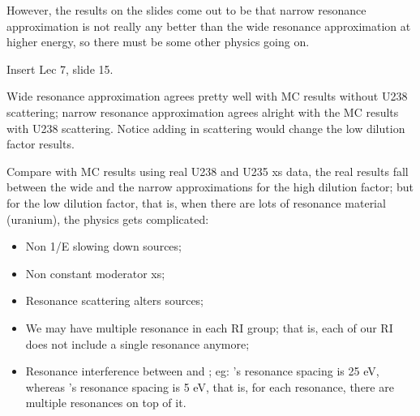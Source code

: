 \documentclass{school-22.211-notes}
\begin{document}
However, the results on the slides come out to be that narrow resonance approximation is not really any better than the wide resonance approximation at higher energy, so there must be some other physics going on. 


Insert Lec 7, slide 15. 

Wide resonance approximation agrees pretty well with MC results without U238 scattering; narrow resonance approximation agrees alright with the MC results with U238 scattering. Notice adding in scattering would change the low dilution factor results. 

Compare with MC results using real U238 and U235 xs data, the real results fall between the wide and the narrow approximations for the high dilution factor; but for the low dilution factor, that is, when there are lots of resonance material (uranium), the physics gets complicated: 
\begin{itemize}
\item Non 1/E slowing down sources;
\item Non constant moderator xs;
\item Resonance scattering alters sources;
\item We may have multiple resonance in each RI group; that is, each of our RI does not include a single resonance anymore;
\item Resonance interference between  and ; eg: 's resonance spacing is 25 eV, whereas 's resonance spacing is 5 eV, that is, for each  resonance, there are multiple  resonances on top of it. 
\end{itemize}
\end{document}
